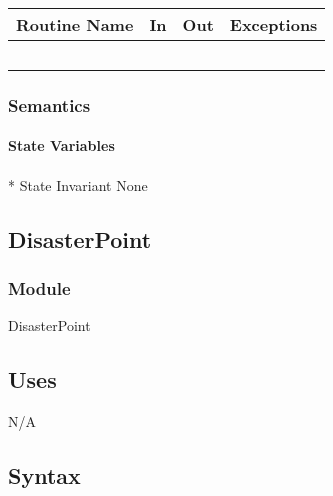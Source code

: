 \documentclass[12pt]{article}
\begin{document}
                \begin{tabular}{| l | l | l | p{5cm} |}
                \hline
                \textbf{Routine Name} & \textbf{In} & \textbf{Out} & \textbf{Exceptions}\\
                \hline
                 &  &  & ~\\
                \hline
                \end{tabular}
                
                \subsubsection* {Semantics}
                
                \paragraph* {State Variables} 
                
                \paragraph{}* {State Invariant}
                None
        
                 \newpage
                \subsection* {DisasterPoint}
                
                \subsubsection*{Module}
                DisasterPoint
                
                \subsection* {Uses}
                N/A
                
                \subsection* {Syntax}
                
\end{document}
